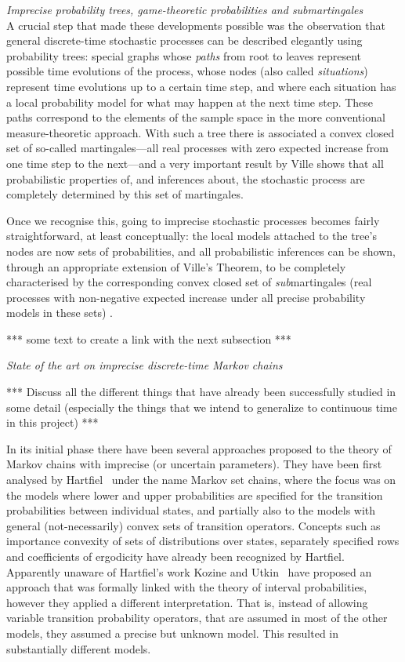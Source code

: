 \documentclass[11pt,dvipsnames,usenames,a4paper]{article}
\begin{document}
\vspace{5pt}
\emph{Imprecise probability trees, game-theoretic probabilities and submartingales}\\[5pt]
A crucial step that made these developments possible was the observation that general discrete-time stochastic processes can be described elegantly using probability trees: special graphs whose \emph{paths} from root to leaves represent possible time evolutions of the process, whose nodes (also called \emph{situations}) represent time evolutions up to a certain time step, and where each situation has a local probability model for what may happen at the next time step.
These paths correspond to the elements of the sample space in the more conventional measure-theoretic approach.
With such a tree there is associated a convex closed set of so-called martingales---all real processes with zero expected increase from one time step to the next---and a very important result by Ville \cite{ville1939,shafer2001} shows that all probabilistic properties of, and inferences about, the stochastic process are completely determined by this set of martingales.

Once we recognise this, going to imprecise stochastic processes becomes fairly straightforward, at least conceptually: the local models attached to the tree's nodes are now sets of probabilities, and all probabilistic inferences can be shown, through an appropriate extension of Ville's Theorem, to be completely characterised by the corresponding convex closed set of \emph{sub}martingales (real processes with non-negative expected increase under all precise probability models in these sets) \cite{cooman2007d,cooman2015:markovergodic,cooman2015:isipta:markov}.

*** some text to create a link with the next subsection ***

\emph{State of the art on imprecise discrete-time Markov chains}

*** Discuss all the different things that have already been successfully studied in some detail (especially the things that we intend to generalize to continuous time in this project) ***

In its initial phase there have been several approaches proposed to the theory of Markov chains with imprecise (or uncertain parameters). They have been first analysed by Hartfiel~\cite{hart:98} under the name Markov set chains, where the focus was on the models where lower and upper probabilities are specified for the transition probabilities between individual states, and partially also to the models with general (not-necessarily) convex sets of transition operators. Concepts such as importance convexity of sets of distributions over states, separately specified rows and coefficients of ergodicity have already been recognized by Hartfiel. Apparently unaware of Hartfiel's work Kozine and Utkin~\cite{utkin:02} have proposed an approach that was formally linked with the theory of interval probabilities, however they applied a different interpretation. That is, instead of allowing variable transition probability operators, that are assumed in most of the other models, they assumed a precise but unknown model. This resulted in substantially different models. 
\end{document}
